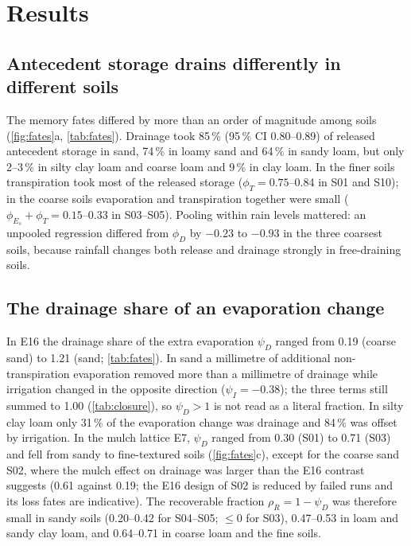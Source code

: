 \documentclass[review,12pt,authoryear]{elsarticle}
\begin{document}

\section{Results}
\subsection{Antecedent storage drains differently in different soils}
\label{sec:results}
The memory fates differed by more than an order of magnitude among soils (\cref{fig:fates}a, \cref{tab:fates}). Drainage took 85\,\% (95\,\% CI 0.80--0.89) of released antecedent storage in sand, 74\,\% in loamy sand and 64\,\% in sandy loam, but only 2--3\,\% in silty clay loam and coarse loam and 9\,\% in clay loam. In the finer soils transpiration took most of the released storage ($\phi_T=0.75$--0.84 in S01 and S10); in the coarse soils evaporation and transpiration together were small ($\phi_{E_s}+\phi_T=0.15$--0.33 in S03--S05). Pooling within rain levels mattered: an unpooled regression differed from $\phi_D$ by $-0.23$ to $-0.93$ in the three coarsest soils, because rainfall changes both release and drainage strongly in free-draining soils.


\subsection{The drainage share of an evaporation change}
In E16 the drainage share of the extra evaporation $\psi_D$ ranged from 0.19 (coarse sand) to 1.21 (sand; \cref{tab:fates}). In sand a millimetre of additional non-transpiration evaporation removed more than a millimetre of drainage while irrigation changed in the opposite direction ($\psi_I=-0.38$); the three terms still summed to 1.00 (\cref{tab:closure}), so $\psi_D>1$ is not read as a literal fraction. In silty clay loam only 31\,\% of the evaporation change was drainage and 84\,\% was offset by irrigation. In the mulch lattice E7, $\psi_D$ ranged from 0.30 (S01) to 0.71 (S03) and fell from sandy to fine-textured soils (\cref{fig:fates}c), except for the coarse sand S02, where the mulch effect on drainage was larger than the E16 contrast suggests (0.61 against 0.19; the E16 design of S02 is reduced by failed runs and its loss fates are indicative). The recoverable fraction $\rho_R=1-\psi_D$ was therefore small in sandy soils (0.20--0.42 for S04--S05; $\leq0$ for S03), 0.47--0.53 in loam and sandy clay loam, and 0.64--0.71 in coarse loam and the fine soils.
\end{document}

